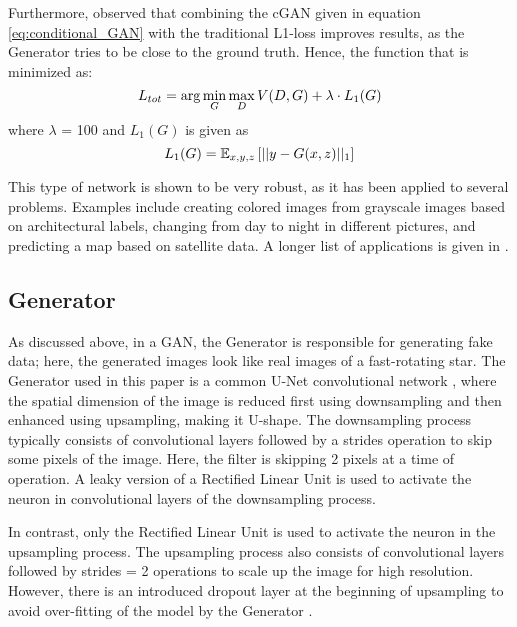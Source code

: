 Furthermore, \cite{isola2017image} observed that combining the cGAN given in equation \ref{eq:conditional_GAN} with the traditional L1-loss improves results, as the Generator tries to be close to the ground truth. Hence, the function that is minimized as:
\begin{equation}
	\centering
	L_{tot} = \arg \min_{G} \max_{D} V(D, G) + \lambda \cdot L_1(G)
	\label{eq:total_gen_loss}
\end{equation}
where $\lambda$ = 100 and $L_1(G)$ is given as
\begin{equation}
	\centering
	L_1(G) = \mathbb{E}_{x,y,z} \left[ ||{y - G(x,z)}||_1 \right]
	\label{eq:l1_loss}
\end{equation}

This type of network is shown to be very robust, as it has been applied to several problems. Examples include creating colored images from grayscale images based on architectural labels, changing from day to night in different pictures, and predicting a map based on satellite data. A longer list of applications is given in \cite{isola2017image}.  


\subsection{Generator}
As discussed above, in a GAN, the Generator is responsible for generating fake data; here, the generated images look like real images of a fast-rotating star. The Generator used in this paper is a common U-Net convolutional network \cite{ronneberger2015u}, where the spatial dimension of the image is reduced first using downsampling and then enhanced using upsampling, making it U-shape. The downsampling process typically consists of convolutional layers followed by a strides operation to skip some pixels of the image. Here, the filter is skipping 2 pixels at a time of operation. A leaky version of a Rectified Linear Unit is used to activate the neuron in convolutional layers of the downsampling process.

In contrast, only the Rectified Linear Unit is used to activate the neuron in the upsampling process. The upsampling process also consists of convolutional layers followed by strides = 2 operations to scale up the image for high resolution. However, there is an introduced dropout layer at the beginning of upsampling to avoid over-fitting of the model by the Generator \cite{isola2017image}.

